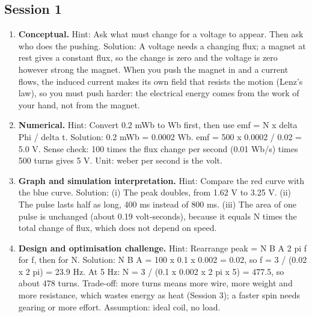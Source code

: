 \documentclass[11pt,a4paper]{article}
\begin{document}
\subsection*{Session 1}
\begin{enumerate}[nosep]
\item \textbf{Conceptual.} Hint: Ask what must change for a voltage to appear. Then ask who does the pushing. Solution: A voltage needs a changing flux; a magnet at rest gives a constant flux, so the change is zero and the voltage is zero however strong the magnet. When you push the magnet in and a current flows, the induced current makes its own field that resists the motion (Lenz's law), so you must push harder: the electrical energy comes from the work of your hand, not from the magnet.
\item \textbf{Numerical.} Hint: Convert 0.2 mWb to Wb first, then use emf = N x delta Phi / delta t. Solution: 0.2 mWb = 0.0002 Wb. emf = 500 x 0.0002 / 0.02 = 5.0 V. Sense check: 100 times the flux change per second (0.01 Wb/s) times 500 turns gives 5 V. Unit: weber per second is the volt.
\item \textbf{Graph and simulation interpretation.} Hint: Compare the red curve with the blue curve. Solution: (i) The peak doubles, from 1.62 V to 3.25 V. (ii) The pulse lasts half as long, 400 ms instead of 800 ms. (iii) The area of one pulse is unchanged (about 0.19 volt-seconds), because it equals N times the total change of flux, which does not depend on speed.
\item \textbf{Design and optimisation challenge.} Hint: Rearrange peak = N B A 2 pi f for f, then for N. Solution: N B A = 100 x 0.1 x 0.002 = 0.02, so f = 3 / (0.02 x 2 pi) = 23.9 Hz. At 5 Hz: N = 3 / (0.1 x 0.002 x 2 pi x 5) = 477.5, so about 478 turns. Trade-off: more turns means more wire, more weight and more resistance, which wastes energy as heat (Session 3); a faster spin needs gearing or more effort. Assumption: ideal coil, no load.
\end{enumerate}
\end{document}
